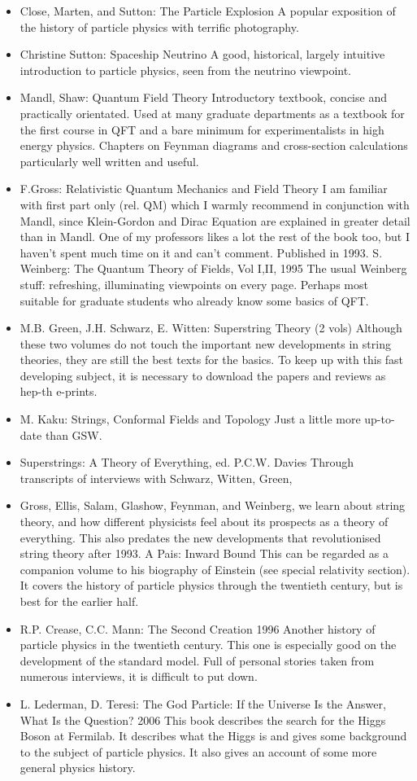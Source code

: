 \documentclass[10pt,a4paper]{book}
\theoremstyle{definition}
\begin{document}
\begin{itemize}
\item Close, Marten, and Sutton: The Particle Explosion
A popular exposition of the history of particle physics with terrific photography.
\item Christine Sutton: Spaceship Neutrino
A good, historical, largely intuitive introduction to particle physics, seen from the neutrino viewpoint.
\item Mandl, Shaw: Quantum Field Theory
Introductory textbook, concise and practically orientated.  Used at many graduate departments as a textbook for the first course in QFT and a bare minimum for experimentalists in high energy physics.  Chapters on Feynman diagrams and cross-section calculations particularly well written and useful.
\item F.Gross: Relativistic Quantum Mechanics and Field Theory
I am familiar with first part only (rel. QM) which I warmly recommend in conjunction with Mandl, since Klein-Gordon and Dirac Equation are explained in greater detail than in Mandl.  One of my professors likes a lot the rest of the book too, but I haven't spent much time on it and can't comment.  Published in 1993.
S. Weinberg: The Quantum Theory of Fields, Vol I,II, 1995
The usual Weinberg stuff: refreshing, illuminating viewpoints on every page.  Perhaps most suitable for graduate students who already know some basics of QFT. 
\item M.B. Green, J.H. Schwarz, E. Witten: Superstring Theory (2 vols)
Although these two volumes do not touch the important new developments in string theories, they are still the best texts for the basics.  To keep up with this fast developing subject, it is necessary to download the papers and reviews as hep-th e-prints.
\item M. Kaku: Strings, Conformal Fields and Topology
Just a little more up-to-date than GSW.
\item Superstrings: A Theory of Everything, ed. P.C.W. Davies
Through transcripts of interviews with Schwarz, Witten, Green, \item Gross, Ellis, Salam, Glashow, Feynman, and Weinberg, we learn about string theory, and how different physicists feel about its prospects as a theory of everything.  This also predates the new developments that revolutionised string theory after 1993.
A Pais: Inward Bound
This can be regarded as a companion volume to his biography of Einstein (see special relativity section).  It covers the history of particle physics through the twentieth century, but is best for the earlier half.
\item R.P. Crease, C.C. Mann: The Second Creation 1996
Another history of particle physics in the twentieth century.  This one is especially good on the development of the standard model.  Full of personal stories taken from numerous interviews, it is difficult to put down.
\item L. Lederman, D. Teresi: The God Particle: If the Universe Is the Answer, What Is the Question? 2006
This book describes the search for the Higgs Boson at Fermilab.  It describes what the Higgs is and gives some background to the subject of particle physics.  It also gives an account of some more general physics history.
\end{itemize}
\end{document}
